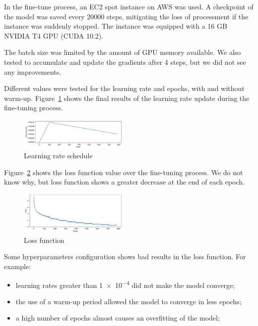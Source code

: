 \documentclass[letterpaper]{article}
\begin{document}
In the fine-tune process, an EC2 spot instance on AWS was used. A checkpoint of the model was saved every \num{20000} steps, mitigating the loss of processment if the instance was suddenly stopped. The instance was equipped with a 16 GB NVIDIA T4 GPU (CUDA 10.2).

The batch size was limited by the amount of GPU memory available. We also tested to accumulate and update the gradients after \num{4} steps, but we did not see any improvements.

Different values were tested for the learning rate and epochs, with and without warm-up. Figure~\ref{fig:learning-rate-schedule} shows the final results of the learning rate update during the fine-tuning process.

\begin{figure}[ht]
    \centering
    \includegraphics[width=0.47\textwidth]{../images/warmup_linear_schedule.pdf}
    \caption{Learning rate schedule}
    \label{fig:learning-rate-schedule}
\end{figure}

Figure~\ref{fig:loss} shows the loss function value over the fine-tuning process. We do not know why, but loss function shows a greater decrease at the end of each epoch.

\begin{figure}[ht]
    \centering
    \includegraphics[width=0.47\textwidth]{../images/loss_function.pdf}
    \caption{Loss function}
    \label{fig:loss}
\end{figure}

Some hyperparameters configuration shows bad results in the loss function. For example:

\begin{itemize}
    \item learning rates greater than \num{1e-4} did not make the model converge;
    \item the use of a warm-up period allowed the model to converge in less epochs;
    \item a high number of epochs almost causes an overfitting of the model;
\end{itemize}
\end{document}
